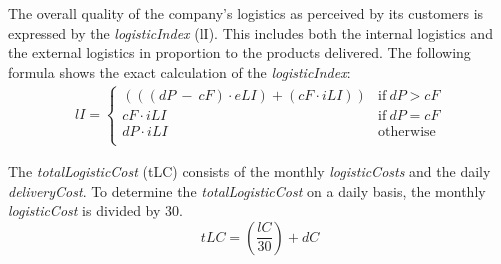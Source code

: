 The overall quality of the company's logistics as perceived by its customers is expressed by the \textit{logisticIndex} (\gls{lI}). This includes both the internal logistics and the external logistics in proportion to the products delivered. The following formula shows the exact calculation of the \textit{logisticIndex}:
\begin{equation}
\label{func:logisticIndex}
\begin{aligned}
lI = 
\begin{cases}
     ((( dP \ - \ cF) \cdot eLI ) + ( cF \cdot iLI )) & \text{if} ~dP > cF \\
     cF \cdot iLI & \text{if} ~dP = cF\\
     dP \cdot iLI & \text{otherwise} \\
\end{cases}
\end{aligned}
\end{equation}

The \textit{totalLogisticCost} (\gls{tLC}) consists of the monthly \textit{logisticCosts} and the daily \textit{deliveryCost}. To determine the \textit{totalLogisticCost} on a daily basis, the monthly \textit{logisticCost} is divided by 30. 
\begin{equation}
    tLC = (\frac{lC}{30}) + dC
\end{equation}

